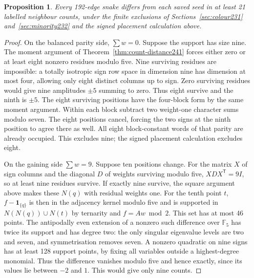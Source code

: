 \documentclass[11pt,a4paper]{article}
\newtheorem{proposition}[theorem]{Proposition}
\theoremstyle{definition}
\theoremstyle{remark}
\begin{document}
\begin{proposition}
Every 192-edge snake differs from each saved seed in at least 21
labelled neighbour counts, under the finite exclusions of
Sections~\ref{sec:colour231} and~\ref{sec:minority232} and the
signed placement calculation above.
\end{proposition}
\begin{proof}
On the balanced parity side, $\sum w=0$. Suppose the support has size
nine. The moment argument of Theorem~\ref{thm:count-distance241}
forces either zero or at least eight nonzero residues modulo five.
Nine surviving residues are impossible: a totally isotropic sign row
space in dimension nine has dimension at most four, allowing only
eight distinct columns up to sign. Zero surviving residues would give
nine amplitudes $\pm5$ summing to zero. Thus eight survive and the ninth
is $\pm5$. The eight surviving positions have the four-block form by
the same moment argument. Within each block subtract two weight-one
character sums modulo seven. The eight positions cancel, forcing the
two signs at the ninth position to agree there as well. All eight
block-constant words of that parity are already occupied. This
excludes nine; the signed placement calculation excludes eight.

On the gaining side $\sum w=9$. Suppose ten positions change. For the
matrix $X$ of sign columns and the diagonal $D$ of weights surviving
modulo five, $XDX^{\mathsf T}=9I$, so at least nine residues survive.
If exactly nine survive, the square argument above makes these $N(q)$
with residual weights one. For the tenth point $t$, $f-\mathbf1_{\{q\}}$
is then in the adjacency kernel modulo five and is supported in
$N(N(q))\cup N(t)$ by ternarity and $f=Aw\bmod2$. This set has at most
46 points. The antipodally even extension of a nonzero such difference
over $\mathbb F_5$ has twice its support and has degree two: the only
singular eigenvalue levels are two and seven, and symmetrisation removes
seven. A nonzero quadratic on nine signs has at least 128 support
points, by fixing all variables outside a highest-degree monomial.
Thus the difference vanishes modulo five and hence exactly, since its
values lie between $-2$ and $1$. This would give only nine counts.


\end{proof}
\end{document}
